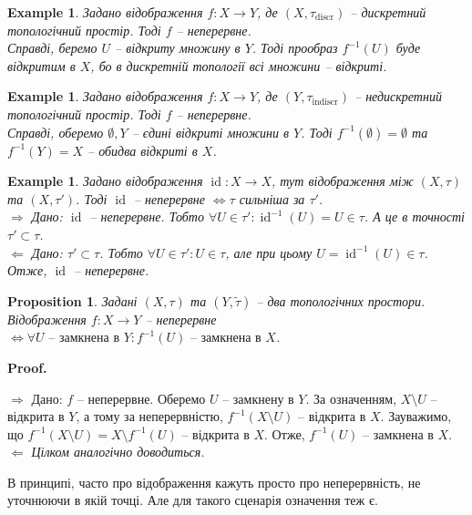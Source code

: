 \documentclass[a4paper, 10pt]{article}
\makeatletter
\def\rightproof{$\boxed{\Rightarrow}$ }
\def\leftproof{$\boxed{\Leftarrow}$ }
\theoremstyle{theoremdd}
\newtheorem{example}[theorem]{Example}
\newtheorem{proposition}[theorem]{Proposition}
\DeclareMathOperator{\id}{id}
\renewenvironment{proof}[1][Proof.\\]{\par
\pushQED{\hfill \qed}%
\normalfont \topsep6\p@\@plus6\p@\relax
\trivlist
\item\relax
{\bfseries
#1\@addpunct{.}}\hspace\labelsep\ignorespaces
}{%
\popQED\endtrivlist\@endpefalse
}
\makeatother
\begin{document}
\begin{example}
Задано відображення $f \colon X \to Y$, де $(X,\tau_{\text{discr}})$ -- дискретний топологічний простір. Тоді $f$ -- неперервне.\\
Справді, беремо $U$ -- відкриту множину в $Y$. Тоді прообраз $f^{-1}(U)$ буде відкритим в $X$, бо в дискретній топології всі множини -- відкриті.
\end{example}

\begin{example}
Задано відображення $f \colon X \to Y$, де $(Y,\tau_{\text{indiscr}})$ -- недискретний топологічний простір. Тоді $f$ -- неперервне.\\
Справді, оберемо $\emptyset,Y$ -- єдині відкриті множини в $Y$. Тоді $f^{-1}(\emptyset) = \emptyset$ та $f^{-1}(Y) = X$ -- обидва відкриті в $X$.
\end{example}

\begin{example}
Задано відображення $\id \colon X \to X$, тут відображення між $(X,\tau)$ та $(X,\tau')$. Тоді $\id$ -- неперервне $\iff \tau$ сильніша за $\tau'$.\\
\rightproof Дано: $\id$ -- неперервне. Тобто $\forall U \in \tau': \id^{-1}(U) = U \in \tau$. А це в точності $\tau' \subset \tau$.
\bigskip \\
\leftproof Дано: $\tau' \subset \tau$. Тобто $\forall U \in \tau': U \in \tau$, але при цьому $U = \id^{-1}(U) \in \tau$. Отже, $\id$ -- неперервне.
\end{example}

\begin{proposition}
Задані $(X,\tau)$ та $(Y,\tilde{\tau})$ -- два топологічних простори.\\
Відображення $f \colon X \to Y$ -- неперервне $\iff \forall U \text{ -- замкнена в } Y: f^{-1}(U) \text{ -- замкнена в } X$.
\end{proposition}

\begin{proof}
\rightproof Дано: $f$ -- неперервне. Оберемо $U$ -- замкнену в $Y$. За означенням, $X \setminus U$ -- відкрита в $Y$, а тому за неперервністю, $f^{-1}(X \setminus U)$ -- відкрита в $X$. Зауважимо, що $f^{-1}(X \setminus U) = X \setminus f^{-1}(U)$ -- відкрита в $X$. Отже, $f^{-1}(U)$ -- замкнена в $X$.
\bigskip \\
\leftproof \textit{Цілком аналогічно доводиться.}
\end{proof}

\noindent В принципі, часто про відображення кажуть просто про неперервність, не уточнюючи в якій точці. Але для такого сценарія означення теж є.
\end{document}
